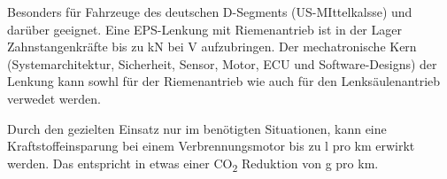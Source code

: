 Besonders für Fahrzeuge des deutschen D-Segments (US-MIttelkalsse) und darüber geeignet. 
Eine EPS-Lenkung mit Riemenantrieb ist in der Lager Zahnstangenkräfte bis zu \unit[18]{kN} bei \unit[12]{V} aufzubringen.
Der mechatronische Kern (Systemarchitektur, Sicherheit, Sensor, Motor, ECU und Software-Designs) der Lenkung kann sowhl für der Riemenantrieb wie auch für den Lenksäulenantrieb verwedet werden. 

Durch den gezielten Einsatz nur im benötigten Situationen, kann eine Kraftstoffeinsparung bei einem Verbrennungsmotor bis zu \unit[0,33]{l} pro \unit[100]{km} erwirkt werden. Das entspricht in etwas einer CO\textsubscript{2} Reduktion von \unit[8]{g} pro \unit[]{km}. 
